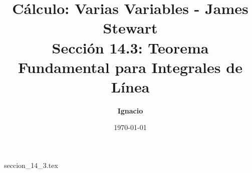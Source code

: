 \documentclass[11pt,spanish,oneside]{report}
\title{\textbf{Cálculo: Varias Variables - James Stewart} \\ \Large Sección 14.3: Teorema Fundamental para Integrales de Línea}
\author{\textbf{Ignacio}}
\date{\today}
\begin{document}
\maketitle

{seccion_14_3.tex}
\end{document}
